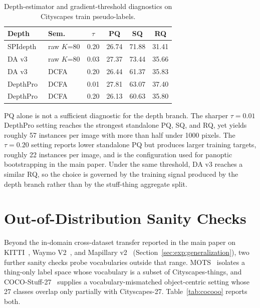\documentclass{article}
\begin{document}
\begin{table}[!htbp]
\caption{Depth-estimator and gradient-threshold diagnostics on Cityscapes train pseudo-labels.}
\label{tab:depth}
\centering
\small
\setlength{\tabcolsep}{6pt}
\begin{tabular}{l l c c c c}
\toprule
Depth & Sem. & $\tau$ & PQ & SQ & RQ \\
\midrule
SPIdepth & raw $K$=80 & 0.20 & 26.74 & 71.88 & 31.41 \\
DA v3~\cite{lin2025da3} & raw $K$=80 & 0.03 & 27.37 & 73.44 & 35.66 \\
DA v3~\cite{lin2025da3} & DCFA & 0.20 & 26.44 & 61.37 & 35.83 \\
DepthPro~\cite{bochkovskii2024depthpro} & DCFA & 0.01 & 27.81 & 63.07 & 37.40 \\
DepthPro~\cite{bochkovskii2024depthpro} & DCFA & 0.20 & 26.13 & 60.63 & 35.80 \\
\bottomrule
\end{tabular}
\end{table}

PQ alone is not a sufficient diagnostic for the depth branch. The sharper $\tau{=}0.01$ DepthPro setting reaches the strongest standalone PQ, SQ, and RQ, yet yields roughly 57 instances per image with more than half under 1000 pixels. The $\tau{=}0.20$ setting reports lower standalone PQ but produces larger training targets, roughly 22 instances per image, and is the configuration used for panoptic bootstrapping in the main paper. Under the same threshold, DA v3 reaches a similar RQ, so the choice is governed by the training signal produced by the depth branch rather than by the stuff-thing aggregate split.

\section{Out-of-Distribution Sanity Checks}
\label{sec:supp:ood}

Beyond the in-domain cross-dataset transfer reported in the main paper on KITTI~\cite{geiger2012kitti}, Waymo V2~\cite{sun2020waymo}, and Mapillary v2~\cite{neuhold2017mapillary} (Section~\ref{sec:exp:generalization}), two further sanity checks probe vocabularies outside that range. MOTS~\cite{voigtlaender2019mots} isolates a thing-only label space whose vocabulary is a subset of Cityscapes-things, and COCO-Stuff-27~\cite{caesar2018coco} supplies a vocabulary-mismatched object-centric setting whose 27 classes overlap only partially with Cityscapes-27. Table~\ref{tab:cocooo} reports both.
\end{document}
